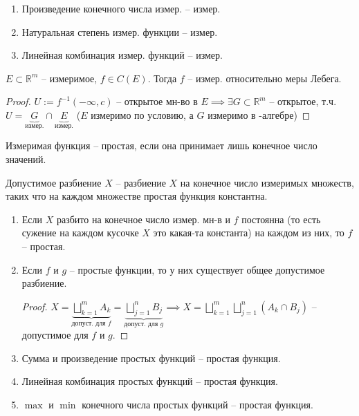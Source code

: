 \begin{consequence}
    \begin{enumerate}
        \item {
            Произведение конечного числа измер. -- измер.
        }
        \item {
            Натуральная степень измер. функции -- измер.
        }
        \item {
            Линейная комбинация измер. функций -- измер.
        }
    \end{enumerate}
\end{consequence}

\begin{theorem}
    $E \subset \mathbb{R}^{m}$ -- измеримое, $f \in C(E)$. Тогда $f$ -- измер. относительно меры Лебега.
\end{theorem}

\begin{proof}
    $U := f^{-1}(-\infty, c)$ -- открытое мн-во в $E \implies \exists G \subset \mathbb{R}^m$ --  открытое, т.ч. $U = \underbrace{G}_{\text{измер.}} \cap \underbrace{E}_{\text{измер.}}$  ($E$ измеримо по условию, а $G$ измеримо в \sigma-алгебре)
\end{proof}

\begin{definition}
    Измеримая функция -- простая, если она принимает лишь конечное число значений.

    Допустимое разбиение $X$ -- разбиение $X$ на конечное число измеримых множеств, таких что на каждом множестве простая функция константна.
\end{definition}

\begin{consequence}
    \begin{enumerate}
        \item {
            Если $X$ разбито на конечное число измер. мн-в и $f$ постоянна (то есть сужение на каждом кусочке $X$ это какая-та константа) на каждом из них, то $f$ -- простая.
        }
        \item {
            Если $f$ и $g$ -- простые функции, то у них существует общее допустимое разбиение.

            \begin{proof}
                $X = \underbrace{\bigsqcup_{k=1}^{m} A_k}_{\text{допуст. для } f} = \underbrace{\bigsqcup_{j=1}^{n} B_j}_{\text{допуст. для } g} \implies X = \bigsqcup_{k=1}^{m} \bigsqcup_{j=1}^{n} (A_k \cap B_j)$ -- допустимое для $f$ и $g$. 
            \end{proof}
        }
        \item {
            Сумма и произведение простых функций -- простая функция.
        }
        \item {
            Линейная комбинация простых функций -- простая функция.
        }
        \item {
            $\max$ и $\min$ конечного числа простых функций -- простая функция.
        }
    \end{enumerate}
\end{consequence}

